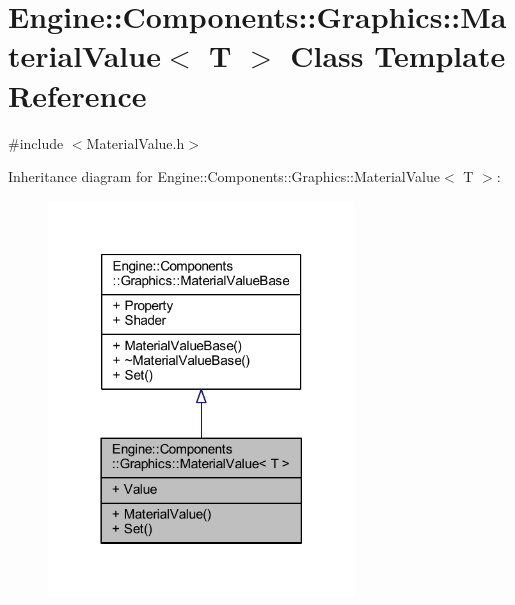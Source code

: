 \hypertarget{classEngine_1_1Components_1_1Graphics_1_1MaterialValue}{}\section{Engine\+:\+:Components\+:\+:Graphics\+:\+:Material\+Value$<$ T $>$ Class Template Reference}
\label{classEngine_1_1Components_1_1Graphics_1_1MaterialValue}


{\ttfamily \#include $<$Material\+Value.\+h$>$}



Inheritance diagram for Engine\+:\+:Components\+:\+:Graphics\+:\+:Material\+Value$<$ T $>$\+:
\nopagebreak
\begin{figure}[H]
\begin{center}
\leavevmode
\includegraphics[width=230pt]{classEngine_1_1Components_1_1Graphics_1_1MaterialValue__inherit__graph}
\end{center}
\end{figure}


